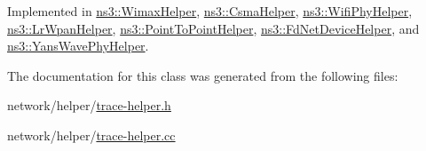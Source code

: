 Implemented in \hyperlink{classns3_1_1WimaxHelper_a17c3c18e993e68328621e3a36d5cc350}{ns3\+::\+Wimax\+Helper}, \hyperlink{classns3_1_1CsmaHelper_af2eac110641882febd39247258efda54}{ns3\+::\+Csma\+Helper}, \hyperlink{classns3_1_1WifiPhyHelper_a930fe270c6c08af23d5333b87ed5997b}{ns3\+::\+Wifi\+Phy\+Helper}, \hyperlink{classns3_1_1LrWpanHelper_a0accf3ecc8c464cde332c92dca565c05}{ns3\+::\+Lr\+Wpan\+Helper}, \hyperlink{classns3_1_1PointToPointHelper_a500491e31095208060544b015d1112d5}{ns3\+::\+Point\+To\+Point\+Helper}, \hyperlink{classns3_1_1FdNetDeviceHelper_ae302a206158bfda94ddea64b711854d2}{ns3\+::\+Fd\+Net\+Device\+Helper}, and \hyperlink{classns3_1_1YansWavePhyHelper_ad015eeeabbdf7522d52de94d22fcc207}{ns3\+::\+Yans\+Wave\+Phy\+Helper}.



The documentation for this class was generated from the following files\+:\begin{DoxyCompactItemize}
\item 
network/helper/\hyperlink{trace-helper_8h}{trace-\/helper.\+h}\item 
network/helper/\hyperlink{trace-helper_8cc}{trace-\/helper.\+cc}\end{DoxyCompactItemize}
